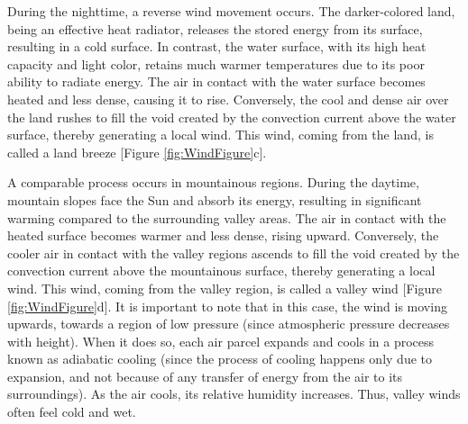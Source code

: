 \documentclass[
  12 pt,
]{Nemilov}
\begin{document}
During the nighttime, a reverse wind movement occurs. The darker-colored land, being an effective heat radiator, releases the stored energy from its surface, resulting in a cold surface. In contrast, the water surface, with its high heat capacity and light color, retains much warmer temperatures due to its poor ability to radiate energy. The air in contact with the water surface becomes heated and less dense, causing it to rise. Conversely, the cool and dense air over the land rushes to fill the void created by the convection current above the water surface, thereby generating a local wind. This wind, coming from the land, is called a land breeze {[}Figure \ref{fig:WindFigure}c{]}.

A comparable process occurs in mountainous regions. During the daytime, mountain slopes face the Sun and absorb its energy, resulting in significant warming compared to the surrounding valley areas. The air in contact with the heated surface becomes warmer and less dense, rising upward. Conversely, the cooler air in contact with the valley regions ascends to fill the void created by the convection current above the mountainous surface, thereby generating a local wind. This wind, coming from the valley region, is called a valley wind {[}Figure \ref{fig:WindFigure}d{]}. It is important to note that in this case, the wind is moving upwards, towards a region of low pressure (since atmospheric pressure decreases with height). When it does so, each air parcel expands and cools in a process known as adiabatic cooling (since the process of cooling happens only due to expansion, and not because of any transfer of energy from the air to its surroundings). As the air cools, its relative humidity increases. Thus, valley winds often feel cold and wet.
\end{document}
